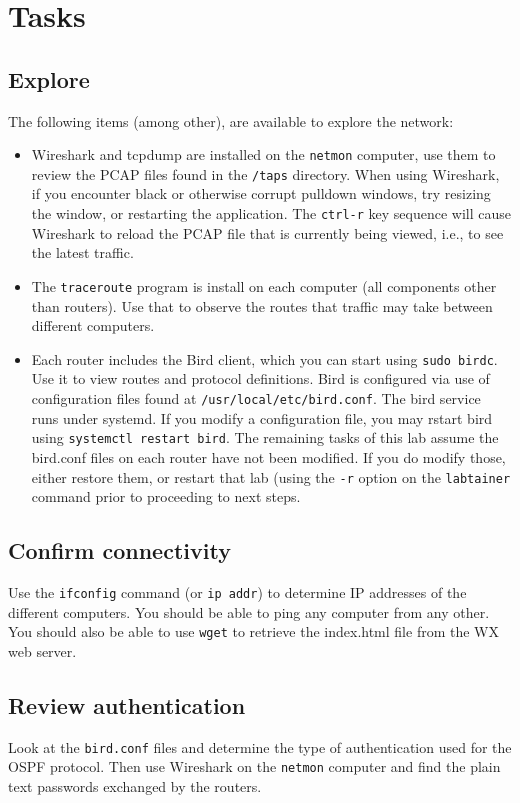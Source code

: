 \section{Tasks}

\subsection{Explore}
The following items (among other), are available to explore the network:
\begin{itemize}
\item Wireshark and tcpdump are installed on the {\tt netmon} computer, use them to review the PCAP files found in
the {\tt /taps} directory.  When using Wireshark, if you encounter black or otherwise corrupt pulldown windows, try resizing the window,
or restarting the application.  The {\tt ctrl-r} key sequence will cause Wireshark to reload the PCAP file that is
currently being viewed, i.e., to see the latest traffic.
\item The {\tt traceroute} program is install on each computer (all components other than routers).  
Use that to observe the routes that traffic may take between different computers.
\item Each router includes the Bird client, which you can start using {\tt sudo birdc}.  Use it to view routes and
protocol definitions.  Bird is configured via use of configuration files found at {\tt /usr/local/etc/bird.conf}. 
The bird service runs under systemd.  If you modify a configuration file, you may rstart bird using {\tt systemctl restart
bird}.  The remaining tasks of this lab assume the bird.conf files on each router have not been modified.  If you do modify
those, either restore them, or restart that lab (using the {\tt -r} option on the {\tt labtainer} command prior to proceeding
to next steps.

\end{itemize}

\subsection{Confirm connectivity}
Use the {\tt ifconfig} command (or {\tt ip addr}) to determine IP addresses of the different computers.  
You should be able to ping any computer from any other.  You should also be able to use {\tt wget} to retrieve the index.html
file from the WX web server.

\subsection{Review authentication}
Look at the {\tt bird.conf} files and determine the type of authentication used for the OSPF protocol.
Then use Wireshark on the {\tt netmon} computer and find the plain text passwords exchanged by the routers.

